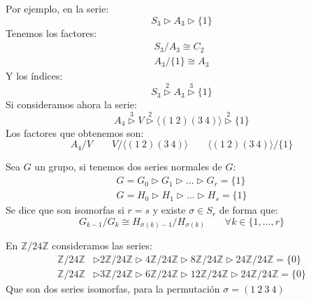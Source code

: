 \begin{ejemplo}
    Por ejemplo, en la serie:
    \begin{equation*}
        S_3 \rhd A_3 \rhd \{1\}
    \end{equation*}
    Tenemos los factores:
    \begin{gather*}
        S_3/A_3 \cong C_2 \\
        A_3/\{1\} \cong A_3
    \end{gather*}
    Y los índices:
    \begin{equation*}
        S_3 \stackrel{2}{\rhd} A_3 \stackrel{3}{\rhd} \{1\}
    \end{equation*}
    Si consideramos ahora la serie:
    \begin{equation*}
        A_4 \stackrel{3}{\rhd} V \stackrel{2}{\rhd} \langle (1\ 2)(3\ 4) \rangle \stackrel{2}{\rhd} \{1\}
    \end{equation*}
    Los factores que obtenemos son:
    \begin{equation*}
        A_4/V \qquad V/\langle (1\ 2)(3\ 4) \rangle \qquad \langle (1\ 2)(3\ 4) \rangle /\{1\}
    \end{equation*}
\end{ejemplo}

\begin{definicion}
    Sea $G$ un grupo, si tenemos dos series normales de $G$:
    \begin{gather*}
        G = G_0 \rhd G_1 \rhd \ldots \rhd G_r = \{1\} \\
        G = H_0 \rhd H_1 \rhd \ldots \rhd H_s = \{1\}
    \end{gather*}
    Se dice que son isomorfas si $r=s$ y existe $\sigma\in S_r$ de forma que:
    \begin{equation*}
        G_{k-1}/G_k \cong H_{\sigma(k)-1}/H_{\sigma(k)} \qquad \forall k \in \{1,\ldots,r\}
    \end{equation*}
\end{definicion}

\begin{ejemplo}
    En $\mathbb{Z}/24\mathbb{Z}$ consideramos las series:
    \begin{align*}
        \mathbb{Z}/24\mathbb{Z} &\rhd 2\mathbb{Z}/24\mathbb{Z} \rhd 4\mathbb{Z}/24\mathbb{Z} \rhd 8\mathbb{Z}/24\mathbb{Z} \rhd 24\mathbb{Z}/24\mathbb{Z} = \{0\} \\
        \mathbb{Z}/24\mathbb{Z} &\rhd 3\mathbb{Z}/24\mathbb{Z} \rhd 6\mathbb{Z}/24\mathbb{Z} \rhd 12\mathbb{Z}/24\mathbb{Z} \rhd 24\mathbb{Z}/24\mathbb{Z} = \{0\}
    \end{align*}
    Que son dos series isomorfas, para la permutación $\sigma=(1\ 2\ 3\ 4)$
\end{ejemplo}

